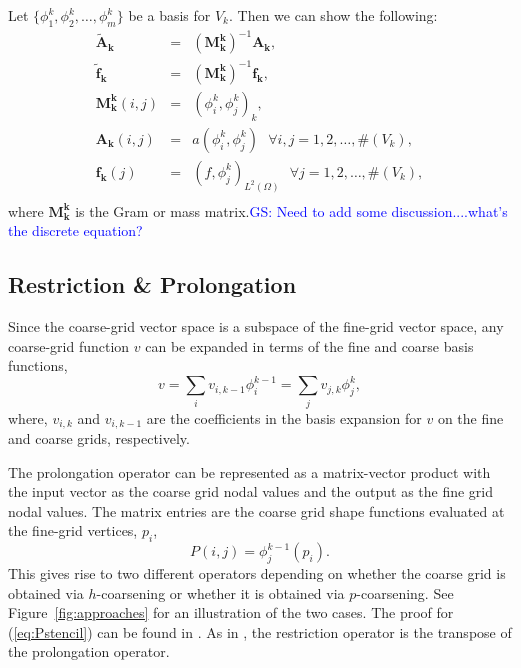 \documentclass[smallcondensed,final]{svjour3}     %
\newcommand{\gsnote}[1]{\textcolor{blue}{GS: #1}}
\begin{document}
Let $\{\phi_1^k,\phi_2^k,\ldots,\phi_{m}^k\}$ be a
basis for $V_k$. Then we can show the following:
\label{eq:femDiscretization}
\begin{eqnarray*}
\mathbf{\tilde{A}_{k}} &=& (\mathbf{M_{k}^{k}})^{-1}\mathbf{A_{k}},  \\
\mathbf{\tilde{f}_{k}} &=& (\mathbf{M_{k}^{k}})^{-1}\mathbf{f_{k}},  \\
\mathbf{M_k^k}(i,j) &=& (\phi_i^k,\phi_j^k)_k, \\
\mathbf{A_{k}}(i,j) &=& a(\phi_i^k,\phi_j^k)  \ \ \ \forall i,j = 1,2,\ldots,\#(V_k), \\
\mathbf{f_{k}}(j) &=& (f,\phi_j^k)_{L^2(\Omega)}  \ \ \ \forall j=1,2,\ldots,\#(V_k), \\
\end{eqnarray*} 
where $\mathbf{M_k^k}$ is the Gram or mass matrix.\gsnote{Need to add
  some discussion....what's the discrete equation?}



\subsection{Restriction \& Prolongation} %
\label{sub:restriction_&_prolongation}
Since the coarse-grid vector space is a subspace of the fine-grid vector space,
any coarse-grid function $v$ can be expanded in terms of the fine
and coarse basis functions, 
\begin{equation} 
  v = \sum_i v_{i,k-1}\phi_i^{k-1} = \sum_j v_{j,k}\phi_j^k, 
\end{equation} 
where, $v_{i,k}$ and $v_{i,k-1}$ are the coefficients in the basis expansion
for $v$ on the fine and coarse grids, respectively. 

The prolongation operator can be represented as a matrix-vector product
with the input vector as the coarse grid nodal values and
the output as the fine grid nodal values. The matrix entries are the coarse
grid shape functions evaluated at the fine-grid vertices, $p_i$,
\begin{equation}
	\label{eq:Pstencil}
	P(i,j) = \phi_j^{k-1}(p_i). 
\end{equation}
This gives rise to two different operators depending on whether the coarse grid
is obtained via $h$-coarsening or whether it is obtained via $p$-coarsening.
See Figure~\ref{fig:approaches} for an illustration of the two cases.  The
proof for (\ref{eq:Pstencil}) can be found in \cite{SampathBiros10}. As in
\cite{SampathBiros10}, the restriction operator is the transpose of the
prolongation operator. 
\end{document}
